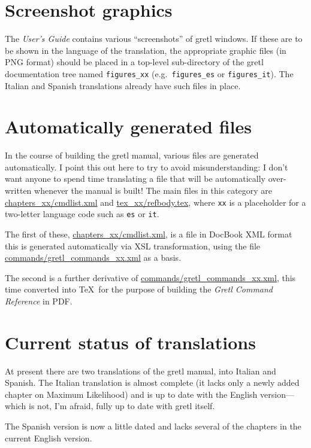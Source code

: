 \documentclass{article}
\begin{document}
\section{Screenshot graphics}

The \textit{User's Guide} contains various ``screenshots'' of
\textsf{gretl} windows.  If these are to be shown in the language of
the translation, the appropriate graphic files (in \textsf{PNG}
format) should be placed in a top-level sub-directory of the
\textsf{gretl} documentation tree named \texttt{figures\_xx} (e.g.\ 
\texttt{figures\_es} or \texttt{figures\_it}).  The Italian and
Spanish translations already have such files in place.

\section{Automatically generated files}

In the course of building the gretl manual, various files are
generated automatically.  I point this out here to try to avoid
misunderstanding: I don't want anyone to spend time translating a
file that will be automatically over-written whenever the manual is
built!  The main files in this category are
%
\url{chapters_xx/cmdlist.xml}
%
and
%
\url{tex_xx/refbody.tex},
%
where \texttt{xx} is a placeholder for a two-letter language code
such as \texttt{es} or \texttt{it}.  

The first of these, \url{chapters_xx/cmdlist.xml}, is a file in
DocBook XML format this is generated automatically via XSL
transformation, using the file \url{commands/gretl_commands_xx.xml} as
a basis.  

The second is a further derivative of
\url{commands/gretl_commands_xx.xml}, this time converted into \TeX\ 
for the purpose of building the \textit{Gretl Command Reference} in
PDF.

\section{Current status of translations}

At present there are two translations of the \textsf{gretl} manual,
into Italian and Spanish.  The Italian translation is almost complete
(it lacks only a newly added chapter on Maximum Likelihood) and is up
to date with the English version---which is not, I'm afraid, fully up
to date with \textsf{gretl} itself.

The Spanish version is now a little dated and lacks several of the
chapters in the current English version.  
\end{document}
